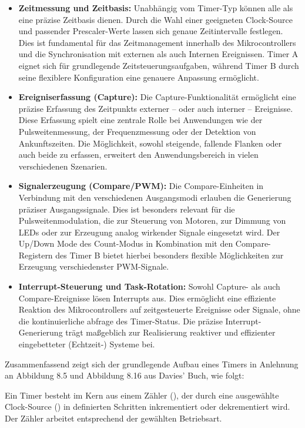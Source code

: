 \begin{itemize}
	\item \textbf{Zeitmessung und Zeitbasis:} Unabh\"angig vom Timer-Typ k\"onnen alle als eine pr\"azise Zeitbasis dienen. Durch die Wahl einer geeigneten Clock-Source und passender Prescaler-Werte lassen sich genaue Zeitintervalle festlegen. Dies ist fundamental f\"ur das Zeitmanagement innerhalb des Mikrocontrollers und die Synchronisation mit externen als auch Internen Ereignissen. Timer A eignet sich f\"ur grundlegende Zeitsteuerungsaufgaben, w\"ahrend Timer B durch seine flexiblere Konfiguration eine genauere Anpassung erm\"oglicht.

	\item \textbf{Ereigniserfassung (Capture):} Die Capture-Funktionalit\"at erm\"oglicht eine pr\"azise Erfassung des Zeitpunkts externer -- oder \ggf auch interner -- Ereignisse. Diese Erfassung spielt eine zentrale Rolle bei Anwendungen wie der Pulsweitenmessung, der Frequenzmessung oder der Detektion von Ankunftszeiten. Die M\"oglichkeit, sowohl steigende, fallende Flanken oder auch beide zu erfassen, erweitert den Anwendungsbereich in vielen verschiedenen Szenarien.

	\item \textbf{Signalerzeugung (Compare/PWM):} Die Compare-Einheiten in Verbindung mit den verschiedenen Ausgangsmodi erlauben die Generierung pr\"aziser Ausgangssignale. Dies ist besonders relevant f\"ur die Pulsweitenmodulation, die zur Steuerung von Motoren, zur Dimmung von LEDs oder zur Erzeugung analog wirkender Signale eingesetzt wird. Der Up/Down Mode des Count-Modus in Kombination mit den Compare-Registern des Timer B bietet hierbei besonders flexible M\"oglichkeiten zur Erzeugung verschiedenster PWM-Signale.

	\newpage
	\item \textbf{Interrupt-Steuerung und Task-Rotation:} Sowohl Capture- als auch Compare-Ereignisse l\"osen Interrupts aus. Dies erm\"oglicht eine effiziente Reaktion des Mikrocontrollers auf zeitgesteuerte Ereignisse oder Signale, ohne die kontinuierliche abfrage des Timer-Status. Die pr\"azise Interrupt-Generierung tr\"agt ma{\ss}geblich zur Realisierung reaktiver und effizienter eingebetteter (Echtzeit-) Systeme bei.
\end{itemize}

Zusammenfassend zeigt sich der grundlegende Aufbau eines Timers in Anlehnung an Abbildung 8.5 und Abbildung 8.16 aus Davies' Buch, wie folgt:

Ein Timer besteht im Kern aus einem Z\"ahler (), der durch eine ausgew\"ahlte Clock-Source () in definierten Schritten inkrementiert oder dekrementiert wird. Der Z\"ahler arbeitet entsprechend der gew\"ahlten Betriebsart.

